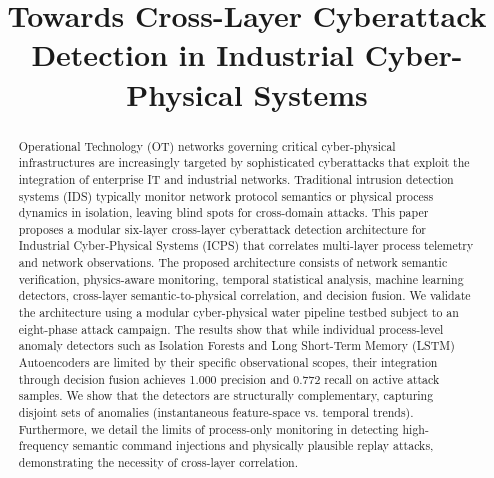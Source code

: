 \documentclass[journal,twoside,web]{ieeecolor}
\begin{document}
\title{Towards Cross-Layer Cyberattack Detection in Industrial Cyber-Physical Systems \vspace{-1.5cm}}

\maketitle

\begin{abstract}
Operational Technology (OT) networks governing critical cyber-physical infrastructures are increasingly targeted by sophisticated cyberattacks that exploit the integration of enterprise IT and industrial networks. Traditional intrusion detection systems (IDS) typically monitor network protocol semantics or physical process dynamics in isolation, leaving blind spots for cross-domain attacks. This paper proposes a modular six-layer cross-layer cyberattack detection architecture for Industrial Cyber-Physical Systems (ICPS) that correlates multi-layer process telemetry and network observations. The proposed architecture consists of network semantic verification, physics-aware monitoring, temporal statistical analysis, machine learning detectors, cross-layer semantic-to-physical correlation, and decision fusion. We validate the architecture using a modular cyber-physical water pipeline testbed subject to an eight-phase attack campaign. The results show that while individual process-level anomaly detectors such as Isolation Forests and Long Short-Term Memory (LSTM) Autoencoders are limited by their specific observational scopes, their integration through decision fusion achieves 1.000 precision and 0.772 recall on active attack samples. We show that the detectors are structurally complementary, capturing disjoint sets of anomalies (instantaneous feature-space vs. temporal trends). Furthermore, we detail the limits of process-only monitoring in detecting high-frequency semantic command injections and physically plausible replay attacks, demonstrating the necessity of cross-layer correlation.
\end{abstract}
\end{document}
